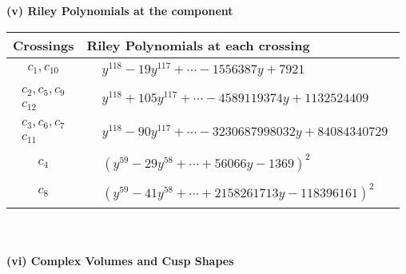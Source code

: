 \documentclass[1p]{elsarticle_modified}
\theoremstyle{definition}
\begin{document}
\newpage\renewcommand{\arraystretch}{1}
\flushleft \textbf{(v) Riley Polynomials at the component}\newline \\
\begin{tabular}{m{50pt}|m{274pt}}
Crossings & \hspace{64pt}Riley Polynomials at each crossing \\
\hline $$\begin{aligned}c_{1},c_{10}\end{aligned}$$&$\begin{aligned}
&y^{118}-19 y^{117}+\cdots-1556387 y+7921
\end{aligned}$\\
\hline $$\begin{aligned}c_{2},c_{5},c_{9}\\c_{12}\end{aligned}$$&$\begin{aligned}
&y^{118}+105 y^{117}+\cdots-4589119374 y+1132524409
\end{aligned}$\\
\hline $$\begin{aligned}c_{3},c_{6},c_{7}\\c_{11}\end{aligned}$$&$\begin{aligned}
&y^{118}-90 y^{117}+\cdots-3230687998032 y+84084340729
\end{aligned}$\\
\hline $$\begin{aligned}c_{4}\end{aligned}$$&$\begin{aligned}
&(y^{59}-29 y^{58}+\cdots+56066 y-1369)^{2}
\end{aligned}$\\
\hline $$\begin{aligned}c_{8}\end{aligned}$$&$\begin{aligned}
&(y^{59}-41 y^{58}+\cdots+2158261713 y-118396161)^{2}
\end{aligned}$\\
\hline
\end{tabular}\\~\\
\newpage\flushleft \textbf{(vi) Complex Volumes and Cusp Shapes}
\end{document}
